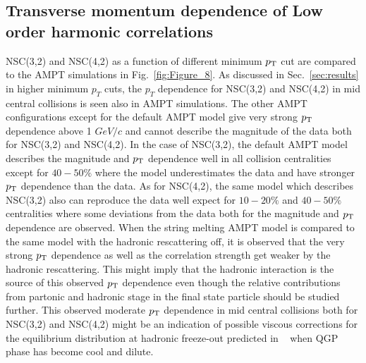 \documentclass[ALICE,manyauthors]{cernphprep}
\begin{document}
\subsection{Transverse momentum dependence of Low order harmonic correlations}
\label{sec:ptdepsc}
NSC(3,2) and NSC(4,2) as a function of different minimum $p_{\textnormal{T}}{}$ cut are compared to the {AMPT} simulations in Fig.~\ref{fig:Figure_8}.
As discussed in Sec.~\ref{sec:results} in higher minimum $p_T$ cuts, the $p_T$ dependence for NSC(3,2) and NSC(4,2) in mid central collisions is seen also in AMPT simulations.
The other AMPT configurations except for the default AMPT model give very strong $p_{\textnormal{T}}{}$ dependence above 1 $GeV/c$ and cannot describe the magnitude of the data both for NSC(3,2) and NSC(4,2).
In the case of NSC(3,2), the default AMPT model describes the magnitude and $p_{\textnormal{T}}{}$ dependence well in all collision centralities except for $40-50\%$ where the model underestimates the data and have stronger $p_{\textnormal{T}}{}$ dependence than the data.
As for  NSC(4,2), the same model which describes NSC(3,2) also can reproduce the data well expect for $10-20\%$ and $40-50\%$ centralities where some deviations from the data both for the magnitude and $p_{\textnormal{T}}{}$ dependence are observed.
When the string melting AMPT model is compared to the same model with the hadronic rescattering off, it is observed that the very strong $p_{\textnormal{T}}{}$ dependence as well as the correlation strength get weaker by the hadronic rescattering.
This might imply that the hadronic interaction is the source of this observed $p_{\textnormal{T}}{}$ dependence even though the relative contributions from partonic and hadronic stage in the final state particle should be studied further.
This observed moderate $p_{\textnormal{T}}{}$ dependence in mid central collisions both for NSC(3,2) and NSC(4,2) might be an indication of possible viscous corrections for the equilibrium distribution at hadronic freeze-out predicted in ~\cite{Luzum:2010ad} when QGP phase has become cool and dilute.
\end{document}
